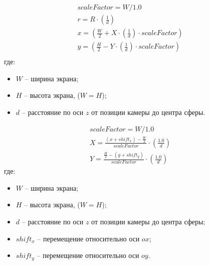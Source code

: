\begin{equation} \label{eq:sphere_to_circle}
\begin{gathered}
	scaleFactor = W / 1.0 \\
	r = R \cdot \left( \frac{1}{d} \right) \\
	x = \left( \frac{W}{2} + X \cdot \left( \frac{1}{d} \right) \cdot scaleFactor \right) \\
	y = \left( \frac{H}{2} - Y \cdot \left( \frac{1}{d} \right) \cdot scaleFactor \right) \\
\end{gathered}
\end{equation}
где: 
\begin{itemize}	
	\item $W$ -- ширина экрана;
	\item $H$ -- высота экрана, ($W = H$);
	\item $d$ -- расстояние по оси $z$ от позиции камеры до центра сферы.
\end{itemize}


\begin{equation} \label{eq:circle_to_sphere}
\begin{gathered}
	scaleFactor = W / 1.0 \\
	X = \frac{(x + shift_x) - \frac{W}{2}}{scaleFactor} \cdot \left( \frac{1.0}{d} \right) \\
	Y = \frac{\frac{H}{2} - (y + shift_y)}{scaleFactor} \cdot \left( \frac{1.0}{d} \right)
\end{gathered}
\end{equation}
где: 
\begin{itemize}	
	\item $W$ -- ширина экрана;
	\item $H$ -- высота экрана, ($W = H$);
	\item $d$ -- расстояние по оси $z$ от позиции камеры до центра сферы;
	\item $shift_x$ -- перемещение относительно оси $ox$;
	\item $shift_y$ -- перемещение относительно оси $oy$.
\end{itemize}